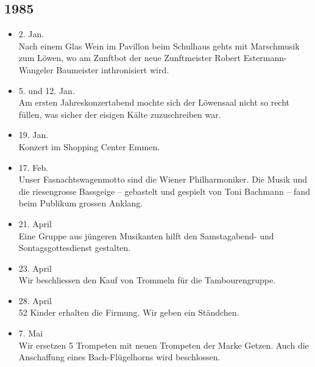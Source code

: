 \subsection{1985}

\begin{history}


    \begin{itemize}

        \item 2. Jan.\\
              Nach einem Glas Wein im Pavillon beim Schulhaus gehts mit Marschmusik
              zum Löwen, wo am Zunftbot der neue Zunftmeister Robert
              Estermann-Wangeler Baumeister inthronisiert wird.

        \item 5. und 12. Jan.\\
              Am ersten Jahreskonzertabend mochte sich der Löwensaal nicht so recht
              füllen, was sicher der eisigen Kälte zuzuschreiben war.

        \item 19. Jan.\\
              Konzert im Shopping Center Emmen.

        \item 17. Feb.\\
              Unser Fasnachtswagenmotto sind die Wiener Philharmoniker. Die Musik und
              die riesengrosse Bassgeige -- gebastelt und gespielt von Toni Bachmann
              -- fand beim Publikum grossen Anklang.

        \item 21. April\\
              Eine Gruppe aus jüngeren Musikanten hilft den Samstagabend- und
              Sontagsgottesdienst gestalten.

        \item 23. April\\
              Wir beschliessen den Kauf von Trommeln für die Tambourengruppe.

        \item 28. April\\
              52 Kinder erhalten die Firmung. Wir geben ein Ständchen.

        \item 7. Mai\\
              Wir ersetzen 5 Trompeten mit neuen Trompeten der Marke Getzen. Auch die
              Anschaffung eines Bach-Flügelhorns wird beschlossen.


\end{itemize}
\end{history}
